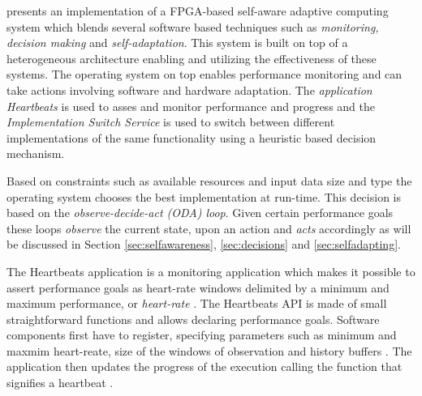 %
\cite{selfaware} presents an implementation of a FPGA-based self-aware adaptive computing system which blends several software based techniques such as \emph{monitoring, decision making} and \emph{self-adaptation}. This system is built on top of a heterogeneous architecture enabling and utilizing the effectiveness of these systems. The operating system on top enables performance monitoring and can take actions involving software and hardware adaptation. The \emph{application Heartbeats} is used to asses and monitor performance and progress and the \emph{Implementation Switch Service} is used to switch between different implementations of the same functionality using a heuristic based decision mechanism. 

Based on constraints such as available resources and input data size and type the operating system chooses the best implementation at run-time. This decision is based on the \emph{observe-decide-act (ODA) loop}. Given certain performance goals these loops \emph{observe} the current state,  upon an action and \emph{acts} accordingly as will be discussed in Section \ref{sec:selfawareness}, \ref{sec:decisions} and \ref{sec:selfadapting}.

The Heartbeats application is a monitoring application which makes it possible to assert performance goals as heart-rate windows delimited by a minimum and maximum performance, or \emph{heart-rate} \cite{evolvable}. The Heartbeats API is made of small straightforward functions and allows declaring performance goals. Software components first have to register, specifying parameters such as minimum and maxmim heart-reate, size of the windows of observation and history buffers \cite{selfaware}. The application then updates the progress of the execution calling the function that signifies a heartbeat \cite{evolvable}.

